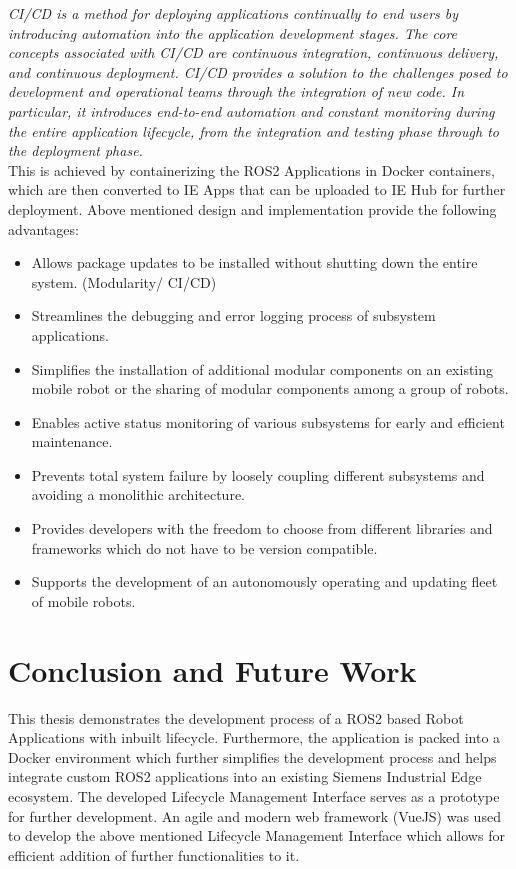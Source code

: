 \textit{
CI/CD is a method for deploying applications continually to end users by introducing automation into the application development stages. The core concepts associated with CI/CD are continuous integration, continuous delivery, and continuous deployment. CI/CD provides a solution to the challenges posed to development and operational teams through the integration of new code. In particular, it introduces end-to-end automation and constant monitoring during the entire application lifecycle, from the integration and testing phase through to the deployment phase.\cite*{cicdOverwiew}}
\\

This is achieved by containerizing the ROS2 Applications in Docker containers, which are then converted to IE Apps that can be uploaded to IE Hub for further deployment. Above mentioned design and implementation provide the following advantages:


\begin{itemize}
	\item 	Allows package updates to be installed without shutting down the entire system. (Modularity/ CI/CD)
	\item 	Streamlines the debugging and error logging process of subsystem applications.
	\item 	Simplifies the installation of additional modular components on an existing mobile robot or the sharing of modular components among a group of robots.
	\item 	Enables active status monitoring of various subsystems for early and efficient maintenance.
	\item 	Prevents total system failure by loosely coupling different subsystems and avoiding a monolithic architecture.
	\item 	Provides developers with the freedom to choose from different libraries and frameworks which do not have to be version compatible.
	\item 	Supports the development of an autonomously operating and updating fleet of mobile robots.
\end{itemize}

\chapter{Conclusion and Future Work}
\label{: Conclusion and Future Work}
	This thesis demonstrates the development process of a ROS2 based Robot Applications with inbuilt lifecycle. Furthermore, the application is packed into a Docker environment which further simplifies the development process and helps integrate custom ROS2 applications into an existing Siemens Industrial Edge ecosystem. The developed Lifecycle Management Interface serves as a prototype for further development. An agile and modern web framework (VueJS) was used to develop the above mentioned Lifecycle Management Interface which allows for efficient addition of further functionalities to it.  
    \\
	
